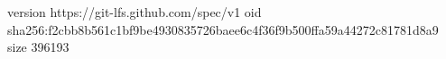 version https://git-lfs.github.com/spec/v1
oid sha256:f2cbb8b561c1bf9be4930835726baee6c4f36f9b500ffa59a44272c81781d8a9
size 396193
